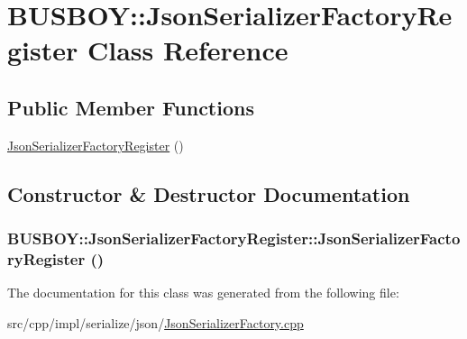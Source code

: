 \hypertarget{classBUSBOY_1_1JsonSerializerFactoryRegister}{
\section{BUSBOY::JsonSerializerFactoryRegister Class Reference}
\label{classBUSBOY_1_1JsonSerializerFactoryRegister}
}
\subsection*{Public Member Functions}
\begin{DoxyCompactItemize}
\item 
\hyperlink{classBUSBOY_1_1JsonSerializerFactoryRegister_abda1c5418645b8874e1910d7f28d9e6d}{JsonSerializerFactoryRegister} ()
\end{DoxyCompactItemize}


\subsection{Constructor \& Destructor Documentation}
\hypertarget{classBUSBOY_1_1JsonSerializerFactoryRegister_abda1c5418645b8874e1910d7f28d9e6d}{
\subsubsection[{JsonSerializerFactoryRegister}]{\setlength{\rightskip}{0pt plus 5cm}BUSBOY::JsonSerializerFactoryRegister::JsonSerializerFactoryRegister ()}}
\label{classBUSBOY_1_1JsonSerializerFactoryRegister_abda1c5418645b8874e1910d7f28d9e6d}


The documentation for this class was generated from the following file:\begin{DoxyCompactItemize}
\item 
src/cpp/impl/serialize/json/\hyperlink{JsonSerializerFactory_8cpp}{JsonSerializerFactory.cpp}\end{DoxyCompactItemize}
